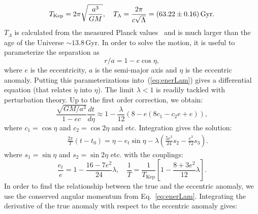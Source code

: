 %
\begin{equation}
T_{\text{Kep}} = 2 \pi \sqrt{\frac{a^3}{G M}}, \quad  T_{\Lambda} = \frac{2 \pi }{c \sqrt{\Lambda}}  = \left(63.22 \pm 0.16\right) {\rm Gyr}.  
\end{equation}
%
$T_{\Lambda}$ is calculated from the measured Planck values~\citep{Aghanim:2018eyx} and is much larger than the age of the Universe $\sim 13.8\, $Gyr. In order to solve the motion, it is useful to parameterize the separation as
%
\begin{equation}
r/a = 1 - e \cos \eta,
 \label{eq:meanAnomDef}
\end{equation}
%
where $e$ is the eccentricity, $a$ is the semi-major axis and $\eta$ is the eccentric anomaly. Putting this parameterizations into~(\ref{eq:enerLam}) gives a differential equation (that relates $\dot{\eta}$ into $\eta$). The limit $\lambda < 1$ is readily tackled with perturbation theory. Up to the first order correction, we obtain:
%
%
%
\begin{equation}
\frac{\sqrt{G M /a^3} }{1-e c} \frac{d t}{d\eta} \approx  1 - \frac{\lambda }{12}  \left( 8 - e (8 c_1 -c_2 e+e)\right),
\end{equation}
%
where $c_1 = \cos \eta$ and $c_2 = \cos 2 \eta$ and etc. Integration gives the solution:
%
\begin{eqnarray}
&&
\frac{2\pi}{T}\left(t - t_0\right) = \eta - e_t \sin \eta  -\lambda \left(\frac{5e^2}{24}   s_2 - \frac{e^3}{72} s_3\right).
\label{eq:motiontime}
\end{eqnarray}
%
where $s_1 = \sin \eta$ and $s_2 = \sin 2 \eta$ etc. with the couplings:
%
\begin{equation}
\frac{e_t}{e} = 1 - \frac{16 - 7 e^2}{24} \lambda, 
\quad \frac{1}{T} = \frac{1}{T_{\text{Kep}}} \left[1 - \frac{8 + 3 e^2}{12} \lambda\right].    
\end{equation}
%
In order to find the relationship between the true and the eccentric anomaly, we use the conserved angular momentum from Eq.~\ref{eq:enerLam}. Integrating the derivative of the true anomaly with respect to the eccentric anomaly gives:
